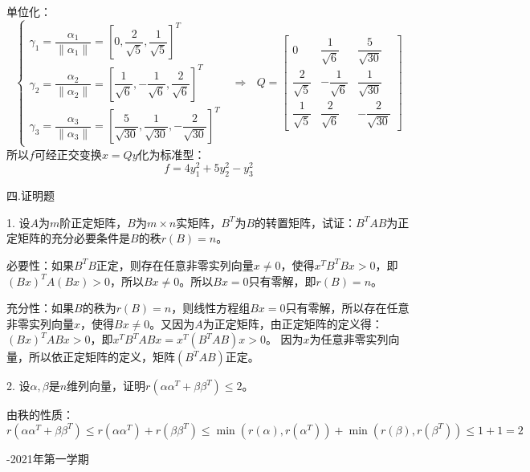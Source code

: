 \documentclass{article}
\begin{document}
\begin{jie}
单位化：
\begin{equation*}
\begin{cases}
\gamma_1=\dfrac{\alpha_1}{\|\alpha_1\|}=\left[0,\dfrac{2}{\sqrt{5}},\dfrac{1}{\sqrt{5}}\right]^T\\[2mm]
\gamma_2=\dfrac{\alpha_2}{\|\alpha_2\|}=\left[\dfrac{1}{\sqrt{6}},-\dfrac{1}{\sqrt{6}},\dfrac{2}{\sqrt{6}}\right]^T\\[2mm]
\gamma_3=\dfrac{\alpha_3}{\|\alpha_3\|}=\left[\dfrac{5}{\sqrt{30}},\dfrac{1}{\sqrt{30}},-\dfrac{2}{\sqrt{30}}\right]^T
\end{cases}~~~\Rightarrow~~~Q=
\begin{bmatrix}
0&\dfrac{1}{\sqrt{6}}&\dfrac{5}{\sqrt{30}}\\[2mm]
\dfrac{2}{\sqrt{5}}&-\dfrac{1}{\sqrt{6}}&\dfrac{1}{\sqrt{30}}\\[2mm]
\dfrac{1}{\sqrt{5}}&\dfrac{2}{\sqrt{6}}&-\dfrac{2}{\sqrt{30}}
\end{bmatrix}
\end{equation*}
所以$f$可经正交变换$x=Qy$化为标准型：
\begin{equation*}
  f=4y_{1}^2+5y_{2}^2-y_{3}^2
\end{equation*}
\end{jie}

四.证明题

1. 设$A$为$m$阶正定矩阵，$B$为$m\times n$实矩阵，$B^{T}$为$B$的转置矩阵，试证：$B^{T}AB$为正定矩阵的充分必要条件是$B$的秩$r(B)=n$。

\begin{zhengming}
必要性：如果$B^TB$正定，则存在任意非零实列向量$x\neq 0$，使得$x^TB^TBx>0$，即$(Bx)^TA(Bx)>0$，所以$Bx\neq 0$。所以$Bx=0$只有零解，即$r(B)=n$。

充分性：如果$B$的秩为$r(B)=n$，则线性方程组$Bx=0$只有零解，所以存在任意非零实列向量$x$，使得$Bx\neq 0$。又因为$A$为正定矩阵，由正定矩阵的定义得：$(Bx)^TABx>0$，即$x^TB^TABx=x^T(B^TAB)x>0$。
因为$x$为任意非零实列向量，所以依正定矩阵的定义，矩阵$(B^TAB)$正定。
\end{zhengming}

2. 设$\alpha,\beta$是$n$维列向量，证明$r(\alpha\alpha^{T}+\beta\beta^{T})\leq 2$。

\begin{zhengming}
由秩的性质：
\begin{equation*}
r(\alpha\alpha^ {T}+\beta\beta^{T})\leq r(\alpha\alpha^ {T})+r(\beta\beta^{T})\leq \min(r(\alpha),r(\alpha^T))+\min(r(\beta),r(\beta^T))\leq 1+1=2
\end{equation*}
\end{zhengming}
\newpage
\hphantom{~~}\hfill {-2021年第一学期} \hfill\hphantom{~~}
\end{document}

